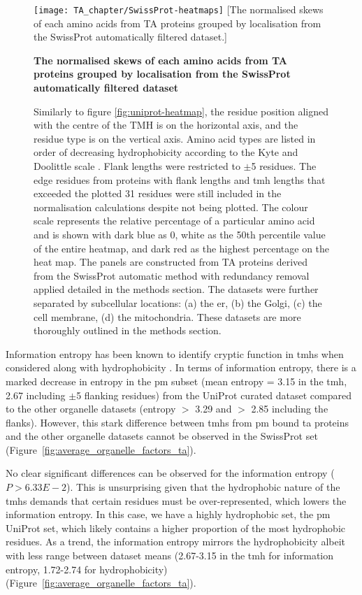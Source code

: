 \begin{figure}
\centering
\texttt{[image: TA\_chapter/SwissProt-heatmaps]}
[The normalised skews of each amino acids from TA proteins grouped by localisation from the SwissProt automatically filtered dataset.]
{\textbf{The normalised skews of each amino acids from TA proteins grouped by localisation from the SwissProt automatically filtered dataset}

Similarly to figure \ref{fig:uniprot-heatmap}, the residue position aligned with the centre of the TMH is on the horizontal axis, and the residue type is on the vertical axis.
Amino acid types are listed in order of decreasing hydrophobicity according to the Kyte and Doolittle scale \cite{Kyte1982}.
Flank lengths were restricted to $\pm$5 residues.
The edge residues from proteins with flank lengths and \gls{tmh} lengths that exceeded the plotted 31 residues were still included in the normalisation calculations despite not being plotted.
The colour scale represents the relative percentage of a particular amino acid and is shown with dark blue as 0, white as the 50th percentile value of the entire heatmap, and dark red as the highest percentage on the heat map.
The panels are constructed from TA proteins derived from the SwissProt automatic method with redundancy removal applied detailed in the methods section.
The datasets were further separated by subcellular locations: (a) the \gls{er}, (b) the Golgi, (c) the cell membrane, (d) the mitochondria.
These datasets are more thoroughly outlined in the methods section.
}

\label{fig:swissprot-heatmap}
\end{figure}

Information entropy has been known to identify cryptic function in \gls{tmh}s when considered along with hydrophobicity \cite{Wong2011, Wong2012}.
In terms of information entropy, there is a marked decrease in entropy in the \gls{pm} subset (mean entropy = 3.15 in the \gls{tmh}, 2.67 including $\pm$5 flanking residues) from the UniProt curated dataset compared to the other organelle datasets (entropy $>$ 3.29 and $>$ 2.85 including the flanks).
However, this stark difference between \gls{tmh}s from \gls{pm} bound \gls{ta} proteins and the other organelle datasets cannot be observed in the SwissProt set (Figure~\ref{fig:average_organelle_factors_ta}).

No clear significant differences can be observed for the information entropy ($P>6.33E-2$).
This is unsurprising given that the hydrophobic nature of the \gls{tmh}s demands that certain residues must be over-represented, which lowers the information entropy.
In this case, we have a highly hydrophobic set, the \gls{pm} UniProt set, which likely contains a higher proportion of the most hydrophobic residues.
As a trend, the information entropy mirrors the hydrophobicity albeit with less range between dataset means (2.67-3.15 in the \gls{tmh} for information entropy, 1.72-2.74 for hydrophobicity)(Figure~\ref{fig:average_organelle_factors_ta}).


